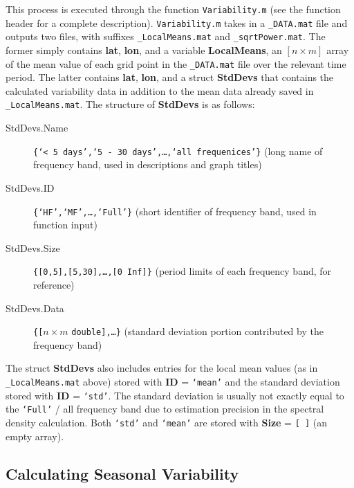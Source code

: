 \documentclass{article}
\begin{document}
This process is executed through the function \texttt{Variability.m} (see the function header for a complete description). \texttt{Variability.m} takes in a \texttt{\_DATA.mat} file and outputs two files, with suffixes \texttt{\_LocalMeans.mat} and \texttt{\_sqrtPower.mat}. The former simply contains \textbf{lat}, \textbf{lon}, and a variable \textbf{LocalMeans}, an $[n\times m]$ array of the mean value of each grid point in the \texttt{\_DATA.mat} file over the relevant time period. The latter contains \textbf{lat}, \textbf{lon}, and a struct \textbf{StdDevs} that contains the calculated variability data in addition to the mean data already saved in \texttt{\_LocalMeans.mat}. The structure of \textbf{StdDevs} is as follows: 
\begin{description}
\item [StdDevs.Name] \texttt{\{`< 5 days',`5 - 30 days',\dots,`all frequenices'\}} (long name of frequency band, used in descriptions and graph titles)
\item [StdDevs.ID] \texttt{\{`HF',`MF',\dots,`Full'\}} (short identifier of frequency band, used in function input)
\item [StdDevs.Size] \texttt{\{[0,5],[5,30],\dots,[0 Inf]\}} (period limits of each frequency band, for reference)
\item [StdDevs.Data] \texttt{\{[}$n\times m$ \texttt{double],\dots\}} (standard deviation portion contributed by the frequency band)
\end{description}

The struct \textbf{StdDevs} also includes entries for the local mean values (as in \texttt{\_LocalMeans.mat} above) stored with \textbf{ID} = \texttt{`mean'} and the standard deviation stored with \textbf{ID} = \texttt{`std'}. The standard deviation is usually not exactly equal to the \texttt{`Full'} / all frequency band due to estimation precision in the spectral density calculation. Both \texttt{`std'} and \texttt{`mean'} are stored with \textbf{Size} = \texttt{[ ]} (an empty array). 

\subsection{Calculating Seasonal Variability}
\end{document}
